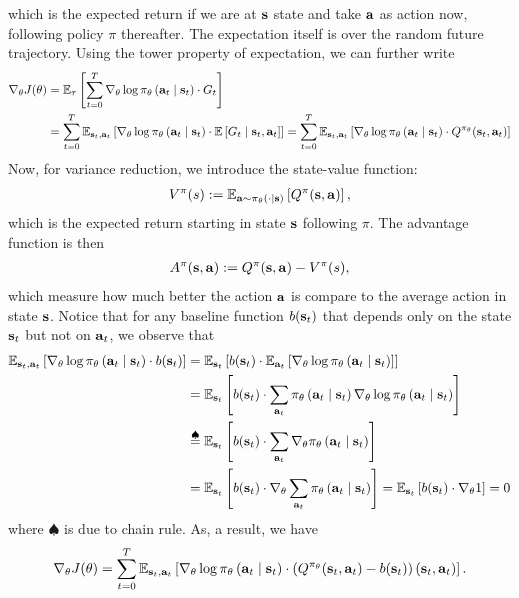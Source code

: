 \documentclass[11pt]{article}  %
\begin{document}
which is the expected return if we are at $\mathbf{s}$ state and take $\mathbf{a}$ as action now, following policy $\pi$ thereafter.
The expectation itself is over the random future trajectory.
Using the tower property of expectation, we can further write 
\begin{align*}
  \nabla_{\theta} J(\theta) &= \mathbb{E}_{\tau}\left[\sum_{t=0}^{T}\nabla_\theta \log \pi_{\theta}\left( \mathbf{a}_t \mid \mathbf{s}_t \right) \cdot G_t\right]\\
  &= \sum_{t=0}^{T}\mathbb{E}_{\mathbf{s}_t, \mathbf{a}_t}\left[\nabla_{\theta} \log\pi_{\theta}\left( \mathbf{a}_t \mid \mathbf{s}_t \right)\cdot\mathbb{E}\left[G_t \mid \mathbf{s}_t, \mathbf{a}_t\right]\right] =  \sum_{t=0}^{T}\mathbb{E}_{\mathbf{s}_t, \mathbf{a}_t}\left[\nabla_{\theta} \log\pi_{\theta}\left( \mathbf{a}_t \mid \mathbf{s}_t \right)\cdot Q^{\pi_\theta}(\mathbf{s}_t, \mathbf{a}_t)\right]
\end{align*}
Now, for variance reduction, we introduce the state-value function:
\begin{align*}
  V^{\pi}(s) := \mathbb{E}_{\mathbf{a} \sim \pi_{\theta}\left( \cdot \mid \mathbf{s} \right)}\left[Q^{\pi}(\mathbf{s}, \mathbf{a})\right],
\end{align*}
which is the expected return starting in state $\mathbf{s}$ following $\pi$.
The advantage function is then 
\begin{align*}
  A^{\pi}(\mathbf{s}, \mathbf{a}) := Q^{\pi}(\mathbf{s}, \mathbf{a}) - V^{\pi}(s),
\end{align*}
which measure how much better the action $\mathbf{a}$ is compare to the average action in state $\mathbf{s}$.
Notice that for any baseline function $b(\mathbf{s}_t)$ that depends only on the state $\mathbf{s}_t$ but not on $\mathbf{a}_t$, we observe that 
\begin{align*}
  \mathbb{E}_{\mathbf{s}_t, \mathbf{a}_t}\left[\nabla_\theta \log \pi_{\theta}\left( \mathbf{a}_t \mid \mathbf{s}_t \right) \cdot b(\mathbf{s}_t)\right] &= \mathbb{E}_{\mathbf{s}_t}\left[b(\mathbf{s}_t) \cdot \mathbb{E}_{\mathbf{a}_t}\left[\nabla_\theta \log \pi_{\theta}\left( \mathbf{a}_t \mid \mathbf{s}_t \right)\right]\right] \\
  &= \mathbb{E}_{\mathbf{s}_t}\left[b(\mathbf{s}_t) \cdot \sum_{\mathbf{a}_t}\pi_{\theta}\left( \mathbf{a}_t \mid \mathbf{s}_t \right)\nabla_\theta \log \pi_{\theta}\left( \mathbf{a}_t \mid \mathbf{s}_t \right)\right] \\
  &\overset{\spadesuit}{=} \mathbb{E}_{\mathbf{s}_t}\left[b(\mathbf{s}_t) \cdot \sum_{\mathbf{a}_t}\nabla_\theta \pi_{\theta}\left( \mathbf{a}_t \mid \mathbf{s}_t \right)\right] \\
  &= \mathbb{E}_{\mathbf{s}_t}\left[b(\mathbf{s}_t) \cdot \nabla_\theta \sum_{\mathbf{a}_t} \pi_{\theta}\left( \mathbf{a}_t \mid \mathbf{s}_t \right)\right] = \mathbb{E}_{\mathbf{s}_t}\left[b(\mathbf{s}_t) \cdot \nabla_\theta 1\right] = 0
\end{align*} 
where $\spadesuit$ is due to chain rule.
As, a result, we have 
\begin{align*}
  \nabla_{\theta} J(\theta) = \sum_{t=0}^{T}\mathbb{E}_{\mathbf{s}_t, \mathbf{a}_t}\left[\nabla_{\theta}\log \pi_{\theta}\left( \mathbf{a}_t \mid \mathbf{s}_t \right)\cdot \left( Q^{\pi_\theta}(\mathbf{s}_t, \mathbf{a}_t) - b(\mathbf{s}_t) \right)(\mathbf{s}_t, \mathbf{a}_t)\right].
\end{align*} 
\end{document}
